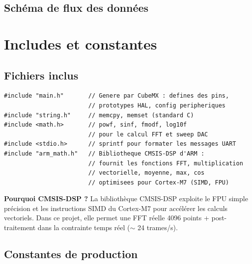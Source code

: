 \documentclass[a4paper,11pt]{article}
\begin{document}
\subsection{Sch\'ema de flux des donn\'ees}

\begin{center}
\end{center}

\newpage

\section{Includes et constantes}

\subsection{Fichiers inclus}

\begin{lstlisting}[style=cstyle,caption={Fichiers d'en-t\^ete inclus}]
#include "main.h"       // Genere par CubeMX : defines des pins,
                        // prototypes HAL, config peripheriques
#include "string.h"     // memcpy, memset (standard C)
#include <math.h>       // powf, sinf, fmodf, log10f
                        // pour le calcul FFT et sweep DAC
#include <stdio.h>      // sprintf pour formater les messages UART
#include "arm_math.h"   // Bibliotheque CMSIS-DSP d'ARM :
                        // fournit les fonctions FFT, multiplication
                        // vectorielle, moyenne, max, cos
                        // optimisees pour Cortex-M7 (SIMD, FPU)
\end{lstlisting}

\textbf{Pourquoi CMSIS-DSP ?} La biblioth\`eque CMSIS-DSP exploite le FPU simple pr\'ecision et les instructions SIMD du Cortex-M7 pour acc\'el\'erer les calculs vectoriels. Dans ce projet, elle permet une FFT r\'eelle 4096 points + post-traitement dans la contrainte temps r\'eel (\(\sim\) 24 trames/s).

\subsection{Constantes de production}
\end{document}

